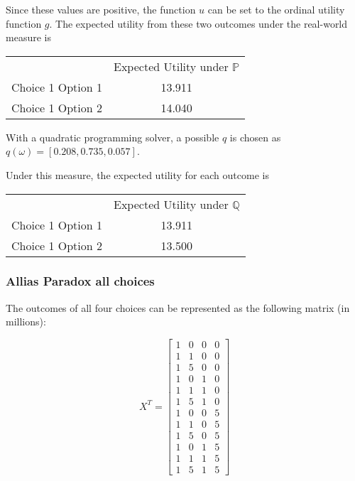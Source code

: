 \documentclass{article}
\begin{document}
Since these values are positive, the function \(u\) can be set to the ordinal utility function \(g\).  The expected utility from these two outcomes under the real-world measure is 

\begin{center} 
	\begin{tabular}{c c}
		& Expected Utility under \(\mathbb{P}\) \\
		Choice 1 Option 1 & 13.911 \\
		Choice 1 Option 2 & 14.040 \\
	\end{tabular}
\end{center}

With a quadratic programming solver, a possible \(q\) is chosen as \(q(\omega)=[0.208, 0.735, 0.057]\).

Under this measure, the expected utility for each outcome is 

\begin{center} 
	\begin{tabular}{c c}
		& Expected Utility under \(\mathbb{Q}\) \\
		Choice 1 Option 1 & 13.911 \\
		Choice 1 Option 2 & 13.500 \\
	\end{tabular}
\end{center}

\subsubsection{Allias Paradox all choices}

The outcomes of all four choices can be represented as the following matrix (in millions):

\[X^T=\begin{bmatrix}
1 & 0 & 0 & 0 \\
1 & 1 & 0 & 0 \\
1 & 5 & 0 & 0 \\
1 & 0 & 1 & 0 \\
1 & 1 & 1 & 0 \\
1 & 5 & 1 & 0 \\
1 & 0 & 0 & 5 \\
1 & 1 & 0 & 5 \\
1 & 5 & 0 & 5 \\
1 & 0 & 1 & 5 \\
1 & 1 & 1 & 5 \\
1 & 5 & 1 & 5
\end{bmatrix}\]
\end{document}
